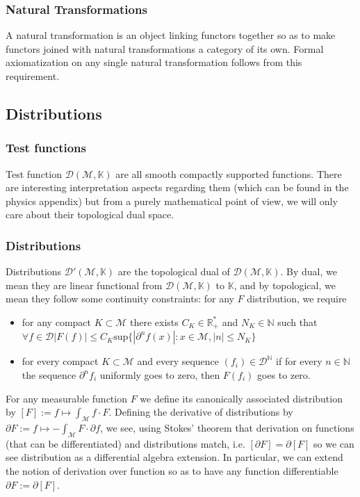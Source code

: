 \documentclass[a4paper,11pt]{article}
\numberwithin{equation}{section}
\theoremstyle{definition}
\begin{document}
\subsubsection{Natural Transformations}
A natural transformation is an object linking functors together so as to make functors joined with natural transformations a category of its own. Formal axiomatization on any single natural transformation follows from this requirement.



\subsection{Distributions}\label{DistribMath}
\subsubsection{Test functions}
    Test function $\mathcal{D}(\mathcal{M},\mathbb{K})$ are all smooth compactly supported functions. There are interesting interpretation aspects regarding them (which can be found in the physics appendix) but from a purely mathematical point of view, we will only care about their topological dual space.
\subsubsection{Distributions}
    Distributions $\mathcal{D}'(\mathcal{M},\mathbb{K})$ are the topological dual of $\mathcal{D}(\mathcal{M},\mathbb{K})$. By dual, we mean they are linear functional from $\mathcal{D}(\mathcal{M},\mathbb{K})$ to $\mathbb{K}$, and by topological, we mean they follow some continuity constraints: for any $F$ distribution, we require
    \begin{itemize}
        \item for any compact $K\subset\mathcal{M}$ there exists $C_K\in \mathbb{R}_+^*$ and $N_K\in\mathbb{N}$ such that \\ $\forall f \in \mathcal{D} |F(f)|\leq C_K \mathrm{sup}\{|\partial^nf(x)|:x\in\mathcal{M},|n|\leq N_K\}$
        \item for every compact $K\subset\mathcal{M}$ and every sequence $(f_i)\in \mathcal{D}^\mathbb{N}$ if for every $n\in\mathbb{N}$ the sequence $\partial^nf_i$ uniformly goes to zero, then $F(f_i)$ goes to zero.
    \end{itemize}

    For any measurable function $F$ we define its canonically associated distribution by $[F]:=f\mapsto\int_\mathcal{M}f\cdot F$. Defining the derivative of distributions by $\partial F:= f\mapsto -\int_\mathcal{M}F\cdot\partial f$, we see, using Stokes' theorem that derivation on functions (that can be differentiated) and distributions match, i.e. $[\partial F]=\partial[F]$ so we can see distribution as a differential algebra extension. In particular, we can extend the notion of derivation over function so as to have any function differentiable $\partial F := \partial [F]$.
\end{document}
